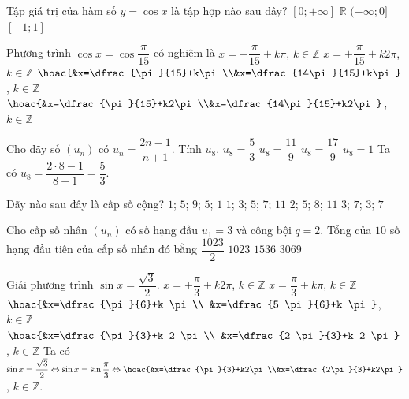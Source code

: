 \begin{ex}%
	Tập giá trị của hàm số $y= \cos x$ là tập hợp nào sau đây?
	\choice
	{$[0; +\infty]$}
	{$\mathbb{R}$}
	{$(-\infty; 0]$}
	{\True $ [-1; 1]$}
\end{ex}
\begin{ex}%
	Phương trình $\cos x=\cos\dfrac{\pi}{15}$ có nghiệm là
	\choice
	{$x=\pm\dfrac{\pi}{15}+k\pi$, $k\in\mathbb{Z}$}
	{\True $x=\pm \dfrac{\pi}{15}+k2\pi$, $k\in\mathbb{Z}$}
	{$\hoac{&x=\dfrac{\pi}{15}+k\pi\\&x=\dfrac{14\pi}{15}+k\pi}$, $k\in\mathbb{Z}$}
	{$\hoac{&x=\dfrac{\pi}{15}+k2\pi\\&x=\dfrac{14\pi}{15}+k2\pi}$, $k\in\mathbb{Z}$}
\end{ex}
\begin{ex}%
	Cho dãy số $(u_n)$ có $u_n=\dfrac{2n-1}{n+1}$. Tính $u_8$.
	\choice
	{\True $u_8=\dfrac{5}{3}$}
	{$u_8=\dfrac{11}{9}$}
	{$u_8=\dfrac{17}{9}$}
	{$u_8=1$}
	\loigiai
	{
		Ta có $u_8=\dfrac{2\cdot 8-1}{8+1}=\dfrac{5}{3}$.
	}
\end{ex}
\begin{ex}%
	Dãy nào sau đây là cấp số cộng?
	\choice
	{$1$; $5$; $9$; $5$; $1$}
	{$1$; $3$; $5$; $7$; $11$}
	{\True $2$; $5$; $8$; $11$}
	{$3$; $7$; $3$; $7$}
\end{ex}
\begin{ex}%
	Cho cấp số nhân $(u_n)$ có số hạng đầu $u_1=3$ và công bội $q=2$. Tổng của $10$ số hạng đầu tiên của cấp số nhân đó bằng
	\choice
	{$\dfrac{1023}{2}$}
	{$1023$}
	{$1536$}
	{\True $3069$}
\end{ex}
\begin{ex}%
	Giải phương trình $\sin x=\dfrac{\sqrt{3}}{2}$.
	\choice
	{$x= \pm \dfrac{\pi}{3}+k 2 \pi$, $k\in\mathbb{Z}$}
	{$x=\dfrac{\pi}{3}+k \pi$, $k\in\mathbb{Z}$}
	{$\hoac{&x=\dfrac{\pi}{6}+k \pi \\ &x=\dfrac{5 \pi}{6}+k \pi}$, $k\in\mathbb{Z}$}
	{\True $\hoac{&x=\dfrac{\pi}{3}+k 2 \pi \\ &x=\dfrac{2 \pi}{3}+k 2 \pi}$, $k\in\mathbb{Z}$}
	\loigiai
	{
		Ta có $\sin x =\dfrac{\sqrt{3}}{2}	 
		\Leftrightarrow  \sin x = \sin \dfrac{\pi}{3} 
		\Leftrightarrow  \hoac{&x=\dfrac{\pi}{3}+k2\pi\\&x=\dfrac{2\pi}{3}+k2\pi}$, $k\in\mathbb{Z}$.
	}
\end{ex}
